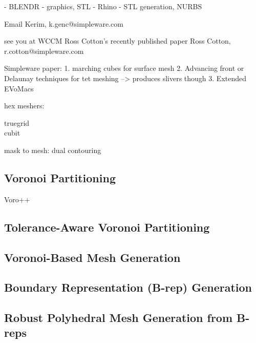 \documentclass[12pt]{article}
\begin{document}
- BLENDR - graphics, STL
- Rhino - STL generation, NURBS

Email Kerim, k.genc@simpleware.com

see you at WCCM
Ross Cotton’s recently published paper
Ross Cotton, r.cotton@simpleware.com

Simpleware paper:
1. marching cubes for surface mesh
2. Advancing front or Delaunay techniques for tet meshing --> produces slivers though
3. Extended EVoMacs

hex meshers:

truegrid\\
cubit

mask to mesh:
dual contouring


\subsection{Voronoi Partitioning}
\label{Voronoi Partitioning}
Voro++

\subsection{Tolerance-Aware Voronoi Partitioning}
\label{Tolerance-Aware Voronoi Partitioning}
\subsection{Voronoi-Based Mesh Generation}
\label{Voronoi-Based Mesh Generation}
\subsection{Boundary Representation (B-rep) Generation}
\label{Boundary Representation (B-rep) Generation}
\subsection{Robust Polyhedral Mesh Generation from B-reps}
\label{Robust Polyhedral Mesh Generation from B-reps}
\newpage
\end{document}
